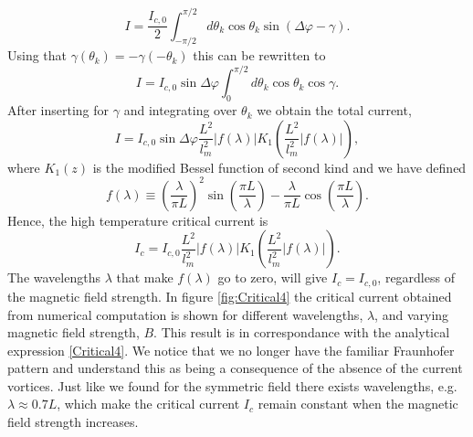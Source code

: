 \begin{equation}
I = \frac{I_{c,0}}{2}\int_{-\pi/2}^{\pi/2}d\theta_k\cos\theta_k\sin(\Delta \varphi - \gamma).
\end{equation}
Using that $\gamma(\theta_k) = -\gamma(-\theta_k)$ this can be rewritten to
\begin{equation}
I = I_{c,0}\sin\Delta\varphi\int_0^{\pi/2}d\theta_k\cos\theta_k\cos\gamma.
\end{equation}
After inserting for $\gamma$ and integrating over $\theta_k$ we obtain the total current,
\begin{equation}
I = I_{c,0}\sin\Delta\varphi\frac{L^2}{l_m^2}\left|f(\lambda)\right|K_1\left(\frac{L^2}{l_m^2}\left|f(\lambda)\right|\right),
\end{equation}
where $K_1(z)$ is the modified Bessel function of second kind and we have defined
\begin{equation}
f(\lambda) \equiv \left(\frac{\lambda}{\pi L}\right)^2\sin\left(\frac{\pi L}{\lambda}\right)-\frac{\lambda}{\pi L}\cos\left(\frac{\pi L}{\lambda}\right).
\end{equation}
Hence, the high temperature critical current is
\begin{equation}
    I_c = I_{c,0}\frac{L^2}{l_m^2}\left|f(\lambda)\right|K_1\left(\frac{L^2}{l_m^2}\left|f(\lambda)\right|\right).
\label{Critical4}
\end{equation}
The wavelengths $\lambda$ that make $f(\lambda)$ go to zero, will give $I_c = I_{c,0}$, regardless of the magnetic field strength. In figure \ref{fig:Critical4} the critical current obtained from numerical computation is shown for different wavelengths, $\lambda$, and varying magnetic field strength, $B$. This result is in correspondance with the analytical expression \eqref{Critical4}. We notice that we no longer have the familiar Fraunhofer pattern and understand this as being a consequence of the absence of the current vortices. Just like we found for the symmetric field there exists wavelengths, e.g. $\lambda \approx 0.7 L$, which make the critical current $I_c$ remain constant when the magnetic field strength increases.


